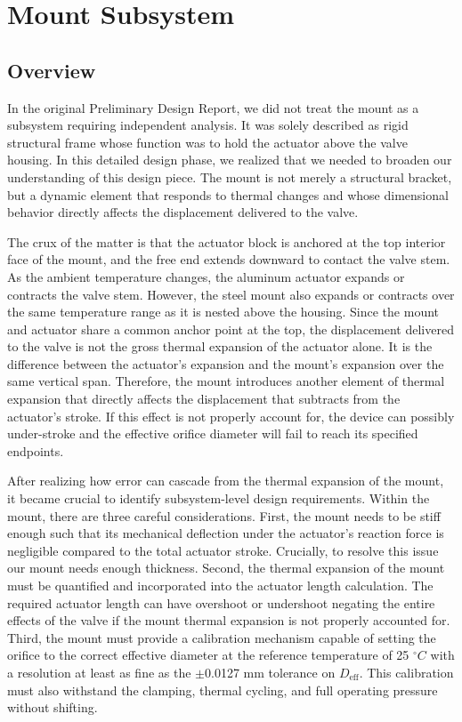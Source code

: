 \documentclass[12pt, letterpaper]{report}%
\newcounter{mycounter}           %
\newcounter{sub}[mycounter]      %
\newcommand{\degC}{^{\circ}C}    %
\begin{document}
    \section{Mount Subsystem}

     \subsection{Overview}

            In the original Preliminary Design Report, we did not treat the mount as a subsystem requiring independent analysis. It was solely described as rigid structural frame whose function was to hold
            the actuator above the valve housing. In this detailed design phase, we realized that we needed to broaden our understanding of this design piece. The mount is not merely a structural bracket, but a dynamic
            element that responds to thermal changes and whose dimensional behavior directly affects the displacement delivered to the valve. 

            The crux of the matter is that the actuator block is anchored at the top interior face of the mount, and the free end extends downward to contact the valve stem. As the ambient temperature changes, the aluminum
            actuator expands or contracts the valve stem. However, the steel mount also expands or contracts over the same temperature range as it is nested above the housing. Since the mount and actuator share a common anchor point at the top, the displacement
            delivered to the valve is not the gross thermal expansion of the actuator alone. It is the difference between the actuator's expansion and the mount's expansion over the same vertical span. Therefore, the mount introduces another element of thermal
            expansion that directly affects the displacement that subtracts from the actuator's stroke. If this effect is not properly account for, the device can possibly under-stroke and the effective orifice diameter will fail to reach its specified endpoints.

            After realizing how error can cascade from the thermal expansion of the mount, it became crucial to identify subsystem-level design requirements. Within the mount, there are three careful considerations. First, the mount needs to be stiff enough such that its mechanical
            deflection under the actuator's reaction force is negligible compared to the total actuator stroke. Crucially, to resolve this issue our mount needs enough thickness. Second, the thermal expansion of the mount must be quantified and incorporated into the actuator length calculation.
            The required actuator length can have overshoot or undershoot negating the entire effects of the valve if the mount thermal expansion is not properly accounted for. Third, the mount must provide a calibration mechanism capable of setting the orifice to the correct effective diameter
            at the reference temperature of 25 $\degC$ with a resolution at least as fine as the $\pm$0.0127 mm tolerance on $D_{\text{eff}}$. This calibration must also withstand the clamping, thermal cycling, and full operating pressure without shifting. 
\end{document}
